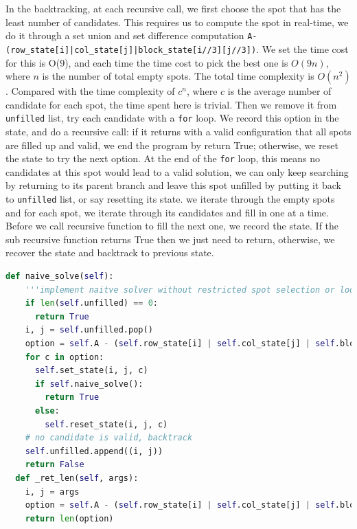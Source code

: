 \documentclass[../main.tex]{subfiles}
\begin{document}
In the backtracking, at each recursive call, we first choose the spot that has the least number of candidates. This requires us to compute the spot in real-time, we do it through a set union and set difference computation \texttt{A-(row\_state[i]|col\_state[j]|block\_state[i//3][j//3])}. We set the time cost for this is O(9), and each time the time cost to pick the best one is $O(9n)$, where $n$ is the number of total empty spots. The total time complexity is $O(n^2)$. Compared with the time complexity of $c^n$, where $c$ is the average number of candidate for each spot, the time spent here is trivial.  Then we remove it from \texttt{unfilled} list, try each candidate with a  \texttt{for} loop. We record this option in the state, and do a recursive call: if it returns with a valid configuration that all spots are filled up and valid, we end the program by return True; otherwise, we reset the state to try the next option. At the end of the \texttt{for} loop, this means no candidates at this spot would lead to a valid solution, we can only keep searching by returning to its parent branch and leave this spot unfilled by putting it back to \texttt{unfilled} list, or say resetting its state.  we iterate through the empty spots and for each spot, we iterate through its candidates and fill in one at a time. Before we call recursive function to fill the next one, we record the state. If the sub recursive function returns True then we just need to return, otherwise, we recover the state and backtrack to previous state. 



\begin{lstlisting}[language=Python]  
  def naive_solve(self):
    '''implement naitve solver without restricted spot selection or look ahead'''
    if len(self.unfilled) == 0:
      return True
    i, j = self.unfilled.pop()
    option = self.A - (self.row_state[i] | self.col_state[j] | self.block_state[i//3 ][j//3])
    for c in option:
      self.set_state(i, j, c)
      if self.naive_solve():
        return True
      else:
        self.reset_state(i, j, c)
    # no candidate is valid, backtrack
    self.unfilled.append((i, j))
    return False
  def _ret_len(self, args):
    i, j = args
    option = self.A - (self.row_state[i] | self.col_state[j] | self.block_state[i//3 ][j//3])
    return len(option)
\end{lstlisting}
\end{document}

